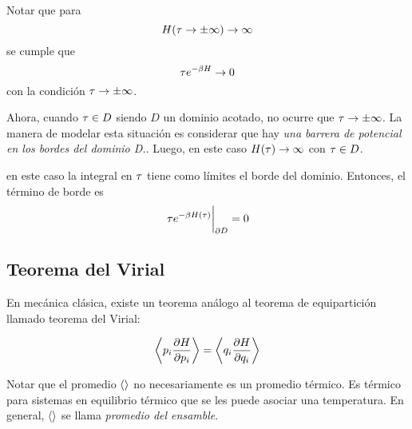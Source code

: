 Notar que para 
\begin{equation}
  H(\tau\to\pm\infty)\to \infty
\end{equation}
se cumple que
\begin{equation}
  \tau e^{-\beta H}\to 0
\end{equation}
con la condición $\tau\to\pm\infty$.

Ahora, cuando $\tau\in D$ siendo $D$ un dominio acotado, no ocurre que $\tau\to\pm\infty$. La manera de modelar esta situación es considerar que hay \textit{una barrera de potencial en los bordes del dominio D.}. Luego, en este caso $H(\tau )\to \infty$ con $\tau\in D$.

en este caso la integral en $\tau $ tiene como límites el borde del dominio. Entonces, el término de borde es
\begin{equation}
\eval{\t e^{-\b H(\t )}}_{\partial D}=0
\end{equation}

\subsection{Teorema del Virial}

En mecánica clásica, existe un teorema análogo al teorema de equipartición llamado teorema del Virial:
\begin{teor}
\begin{equation}
  \ev{p_i\pdv{H}{p_i}}=\ev{q_i\pdv{H}{q_i}}
\end{equation}
\end{teor}
Notar que el promedio $\ev{}$ no necesariamente es un promedio térmico. Es térmico para sistemas en equilibrio térmico que se les puede asociar una temperatura. En general, $\ev{}$ se llama \textit{promedio del ensamble}.

